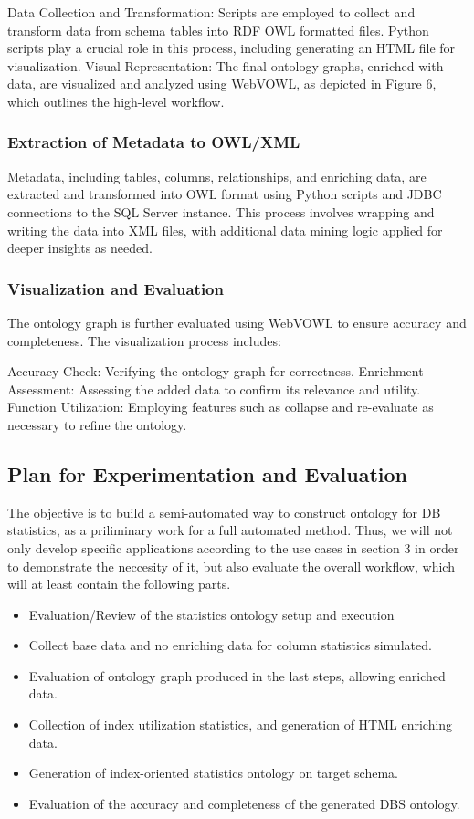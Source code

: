 \documentclass[sigconf]{acmart}
\begin{document}
Data Collection and Transformation: Scripts are employed to collect and transform data from schema tables into RDF OWL formatted files. Python scripts play a crucial role in this process, including generating an HTML file for visualization.
Visual Representation: The final ontology graphs, enriched with data, are visualized and analyzed using WebVOWL, as depicted in Figure 6, which outlines the high-level workflow.

\subsubsection{Extraction of Metadata to OWL/XML}
Metadata, including tables, columns, relationships, and enriching data, are extracted and transformed into OWL format using Python scripts and JDBC connections to the SQL Server instance. This process involves wrapping and writing the data into XML files, with additional data mining logic applied for deeper insights as needed.

\subsubsection{Visualization and Evaluation}
The ontology graph is further evaluated using WebVOWL to ensure accuracy and completeness. The visualization process includes:

Accuracy Check: Verifying the ontology graph for correctness.
Enrichment Assessment: Assessing the added data to confirm its relevance and utility.
Function Utilization: Employing features such as collapse and re-evaluate as necessary to refine the ontology.

\subsection{Plan for Experimentation and Evaluation}
The objective is to build a semi-automated way to construct ontology for DB statistics, as a priliminary work for a full automated method. Thus, we will not only develop specific applications according to the use cases in section 3 in order to demonstrate the neccesity of it, but also evaluate the overall workflow, which will at least contain the following parts.

\begin{itemize}
\item Evaluation/Review of the statistics ontology setup and execution
\item Collect base data and no enriching data for column statistics simulated.
\item Evaluation of ontology graph produced in the last steps, allowing enriched data.
\item Collection of index utilization statistics, and generation of HTML enriching data.
\item Generation of index-oriented statistics ontology on target schema.
\item Evaluation of the accuracy and completeness of the generated DBS ontology.
\end{itemize}
\end{document}
